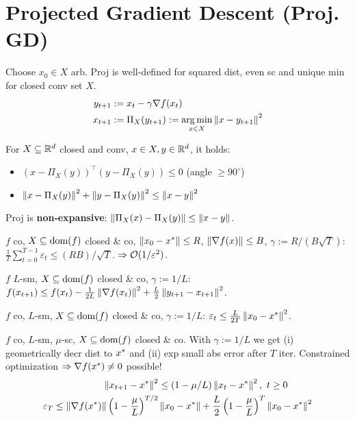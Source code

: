 \section*{Projected Gradient Descent \textbf{(Proj. GD)}}
Choose $x_0 \in X$ arb. Proj is well-defined for squared dist, even sc and unique min for closed conv set $X$.
\begin{align*}
    y_{t+1} &:= x_t - \gamma \nabla f(x_t) \\
    x_{{t+1}} &:= \Pi_X (y_{t+1}) := \operatorname*{arg\,min}_{x \in X} \left\lVert x - y_{t+1} \right\rVert^2
\end{align*}

For $X \subseteq \mathbb{R}^d$ closed and conv, $x \in X, y \in \mathbb{R}^d$, it holds:
\begin{itemize} %
    \item $(x - \Pi_X(y))^\top (y - \Pi_X(y)) \leq 0$ (angle $\geq 90^\circ$)
    \item $\left\lVert x - \Pi_X(y) \right\rVert^2 + \left\lVert y - \Pi_X(y) \right\rVert^2 \leq \left\lVert x - y \right\rVert^2$
\end{itemize}

Proj is \textbf{non-expansive}: $\left\lVert \Pi_X(x) - \Pi_X(y) \right\rVert \leq \left\lVert x - y \right\rVert$.

$f$ co, $X \subseteq \operatorname*{\text{dom}}(f)$ closed \& co, $\left\lVert x_0 - x^* \right\rVert \leq R$, $\left\lVert \nabla f(x) \right\rVert \leq B$, $\gamma := R/(B\sqrt{T})$: $\frac{1}{T} \sum_{t=0}^{T-1} \varepsilon_t \leq (RB)/\sqrt{T}$. $\Rightarrow \mathcal{O}(1/\varepsilon^2)$.

$f$ $L$-sm, $X \subseteq \operatorname*{\text{dom}}(f)$ closed \& co, $\gamma := 1/L$: $f(x_{{t+1}}) \leq f(x_t) - \frac{1}{2L} \left\lVert \nabla f(x_t) \right\rVert^2 + \frac{L}{2} \left\lVert y_{t+1} - x_{t+1} \right\rVert^2$.

$f$ co, $L$-sm, $X \subseteq \operatorname*{\text{dom}}(f)$ closed \& co, $\gamma := 1/L$: $\varepsilon_t \leq \frac{L}{2T} \left\lVert x_0 - x^* \right\rVert^2$.

$f$ co, $L$-sm, $\mu$-sc, $X \subseteq \operatorname*{\text{dom}}(f)$ closed \& co. With $\gamma := 1/L$ we get (i) geometrically decr dist to $x^*$ and (ii) exp small abs error after $T$ iter. Constrained optimization $\Rightarrow \nabla f(x^*) \neq 0$ possible!
\begin{align*}
    \left\lVert x_{{t+1}} - x^* \right\rVert^2 &\leq (1 - \mu/L) \left\lVert x_t - x^* \right\rVert^2, \ t \geq 0\\
    \varepsilon_T \leq \left\lVert \nabla f(x^*) \right\rVert \left( 1- \frac{\mu}{L} \right)^{T/2} &\left\lVert x_0 - x^* \right\rVert + \frac{L}{2} \left( 1 - \frac{\mu}{L} \right)^T \left\lVert x_0 - x^* \right\rVert^2
\end{align*} 



